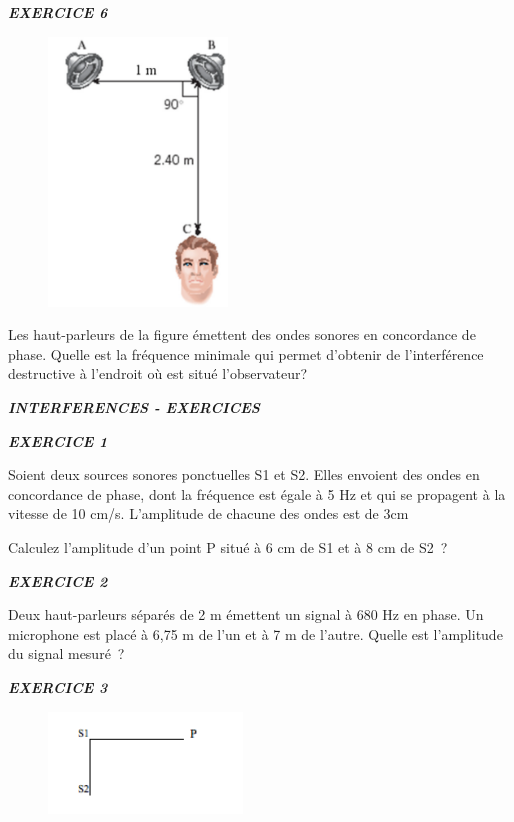 \emph{\textbf{EXERCICE 6}}

\begin{figure}
\centering
\includegraphics[width=4.757cm,height=7.147cm]{Pictures/10000001000001BA00000298E2F6E319C348E061.png}
\caption{}
\end{figure}

Les haut-parleurs de la figure émettent des ondes sonores en concordance
de phase. Quelle est la fréquence minimale qui permet d'obtenir de
l'interférence destructive à l'endroit où est situé l'observateur?

\emph{\textbf{INTERFERENCES - EXERCICES}}

\emph{\textbf{EXERCICE 1}}

Soient deux sources sonores ponctuelles S1 et S2. Elles envoient des
ondes en concordance de phase, dont la fréquence est égale à 5 Hz et qui
se propagent à la vitesse de 10 cm/s. L'amplitude de chacune des ondes
est de 3cm

Calculez l'amplitude d'un point P situé à 6 cm de S1 et à 8 cm de S2~?

\emph{\textbf{EXERCICE 2}}

Deux haut-parleurs séparés de 2 m émettent un signal à 680 Hz en phase.
Un microphone est placé à 6,75 m de l'un et à 7 m de l'autre. Quelle est
l'amplitude du signal mesuré~?

\emph{\textbf{EXERCICE 3}}

\begin{figure}
\centering
\includegraphics[width=5.151cm,height=2.729cm]{Pictures/10000001000000BC000000630AF71C86AA2A0A65.png}
\caption{}
\end{figure}

